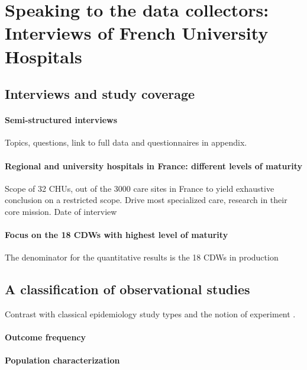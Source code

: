 \documentclass{report}
\begin{document}
\section{Speaking to the data collectors: Interviews of French
  University Hospitals}\label{sec:cdw:methods}

\subsection{Interviews and study coverage}\label{subsec:cdw:interviews}

\paragraph{Semi-structured interviews}

Topics, questions, link to full data and questionnaires in appendix.

\paragraph{Regional and university hospitals in France: different levels of maturity}

Scope of 32 CHUs, out of the 3000 care sites in France to yield exhaustive
conclusion on a restricted scope. Drive most specialized care, research in their
core mission. Date of interview

\paragraph{Focus on the 18 CDWs with highest level of maturity}

The denominator for the quantitative results is the 18 CDWs in production

\subsection{A classification of observational
  studies}\label{subsec:cdw:classification}

Contrast with classical epidemiology study types and the notion of experiment \citep{rothman2012epidemiology}.

\paragraph{Outcome frequency}
\paragraph{Population characterization}
\end{document}
